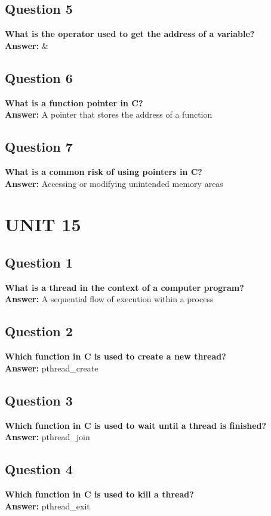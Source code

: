 \documentclass[11pt,parskip]{scrartcl}
\begin{document}
\subsection*{Question 5}
\textbf{What is the operator used to get the address of a variable?} \\
\textbf{Answer:} \&

\subsection*{Question 6}
\textbf{What is a function pointer in C?} \\
\textbf{Answer:} A pointer that stores the address of a function

\subsection*{Question 7}
\textbf{What is a common risk of using pointers in C?} \\
\textbf{Answer:} Accessing or modifying unintended memory areas

\section*{UNIT 15}

\subsection*{Question 1} 
\textbf{What is a thread in the context of a computer program?} \\
\textbf{Answer:} A sequential flow of execution within a process

\subsection*{Question 2} 
\textbf{Which function in C is used to create a new thread?} \\
\textbf{Answer:} pthread\_create

\subsection*{Question 3}
\textbf{Which function in C is used to wait until a thread is finished?} \\
\textbf{Answer:} pthread\_join

\subsection*{Question 4}
\textbf{Which function in C is used to kill a thread?} \\
\textbf{Answer:} pthread\_exit
\end{document}
